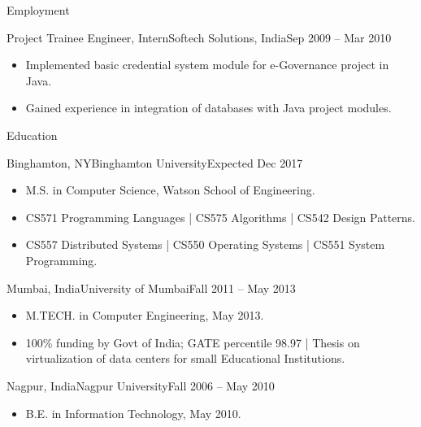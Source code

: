 \documentclass[]{mcdowellcv}
\begin{document}
\begin{cvsection}{Employment}
		\begin{cvsubsection}{Project Trainee Engineer, Intern}{Softech Solutions, India}{Sep 2009 -- Mar 2010}		
			\begin{itemize}
				\item Implemented basic credential system module for e-Governance project in Java.
				\item Gained experience in integration of databases with Java project modules.
			\end{itemize}
		\end{cvsubsection}
	\end{cvsection}
	\begin{cvsection}{Education}
		\begin{cvsubsection}{Binghamton, NY}{Binghamton University}{Expected Dec 2017}
			\begin{itemize}
				\item M.S. in Computer Science, Watson School of Engineering.
				\item CS571 Programming Languages | CS575 Algorithms | CS542 Design Patterns.
				\item CS557 Distributed Systems | CS550 Operating Systems | CS551 System Programming. 
			\end{itemize}
		\end{cvsubsection}

		\begin{cvsubsection}{Mumbai, India}{University of Mumbai}{Fall 2011 -- May 2013}
			\begin{itemize}
				\item M.TECH. in Computer Engineering, May 2013.
				\item 100\% funding by Govt of India; GATE percentile 98.97 | Thesis on virtualization of data centers for small Educational Institutions.
			\end{itemize}
		\end{cvsubsection}

		\begin{cvsubsection}{Nagpur, India}{Nagpur University}{Fall 2006 -- May 2010}
			\begin{itemize}
				\item B.E. in Information Technology, May 2010.
			\end{itemize}
		\end{cvsubsection}
	\end{cvsection}
\end{document}

